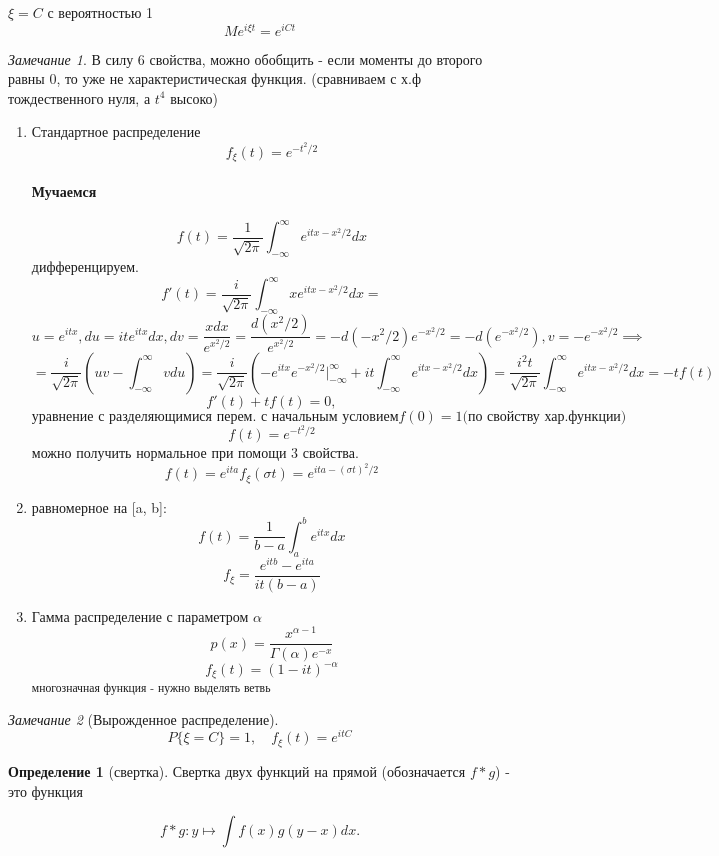 \documentclass[a4paper]{article}
\theoremstyle{definition}
\newtheorem*{definition}{Определение}
\theoremstyle{remark}
\newtheorem*{remark}{Замечание}
\begin{document}
$\xi = C $ с вероятностью 1
\[Me^{i\xi t} = e^{iCt}\]
\begin{remark}
    В силу 6 свойства, можно обобщить - если моменты до второго равны 0, то уже не характеристическая функция. (сравниваем с х.ф тождественного нуля, а $t^4$ высоко)
\end{remark}
\begin{enumerate}
    \item Стандартное распределение
    \[f_\xi(t) = e^{-t^2/2}\]
    \paragraph*{Мучаемся}
        \[f(t) = \frac1{\sqrt{2 \pi}}\int_{-\infty}^{\infty} e^{itx - x^2/2}dx\]
        дифференцируем.
        \[f'(t) = \frac{i}{\sqrt{2 \pi}}\int_{-\infty}^{\infty} xe^{itx - x^2/2}dx = \]
        \[u = e^{itx}, du = it e^{itx}dx, dv = \frac{xdx}{e^{x^2/2}} = \frac{d(x^2/2)}{e^{x^2/2}}= - d(-x^2/2)e^{-x^2/2} = -d(e^{-x^2/2}), v = -e^{-x^2/2}\implies\]
        \[ =\frac{i}{\sqrt{2 \pi}} (uv - \int_{-\infty}^{\infty} vdu)=\frac{i}{\sqrt{2 \pi}} ({-e^{itx}e^{-x^2/2}|_{-\infty}^{\infty} } + it\int_{-\infty}^{\infty} e^{itx - x^2/2}dx) = \frac{i^2 t}{\sqrt{2\pi}}\int_{-\infty}^{\infty} e^{itx - x^2/2}dx = -tf(t) \]
        \[f'(t) + tf(t) = 0,\] \[\text{уравнение с разделяющимися перем. с начальным условием} f(0) = 1 \text{(по свойству хар.функции)}\]
        \[f(t) = e^{-t^2/2}\]
    можно получить нормальное при помощи 3 свойства.
    \[f(t) = e^{ita} f_\xi(\sigma t) = e^{ita - (\sigma t)^2 /2} \]
    \item равномерное на [a, b]:
    \[f(t) = \frac1{b - a}\int_{a}^{b}e^{itx}dx\]
    \[f_\xi = \frac{e^{itb} - e^{ita}}{it(b-a)}\]
    \item Гамма распределение с параметром $\alpha$
    \[p(x) = \frac{x^{\alpha-1}}{\Gamma(\alpha)e^{-x}}\]
    \[f_\xi (t) = (1-it)^{-\alpha}\]
    \textsubscript{многозначная функция - нужно выделять ветвь}
\end{enumerate}
\begin{remark}[Вырожденное распределение]
    \[P\{\xi = C\} = 1, \quad f_\xi (t) = e^{itC}\]
\end{remark}
\begin{definition}[свертка]
    Свертка двух функций на прямой (обозначается $f \ast  g$) - это функция

$$f \ast  g : y \mapsto 
\int f(x)g(y - x)dx.$$
\end{definition}
\end{document}
